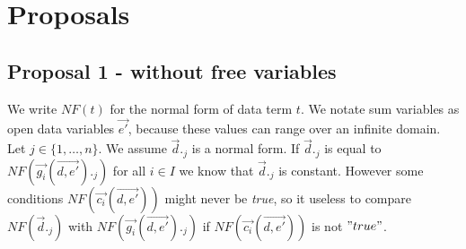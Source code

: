 \index{}\documentclass[a4paper,10pt]{article}
\theoremstyle{plain}
\theoremstyle{definition}
\newcommand{\tool}{\textit{lpeconstelm}}
\newcommand{\ovr}{\overrightarrow}
\newcommand{\pp}{process parameter}
\newcommand{\pps}{process parameters}
\newcommand{\ti}{\textit}
\newcommand{\Sig}{\nm{Sig}}
\newcommand{\Sort}{\nm{Sort}}
\newcommand{\Fun}{\nm{Fun}}
\newcommand{\ap}{{:}}
\begin{document}



\section{Proposals}
\subsection{Proposal 1 - without free variables} \label{sec:prop1}
We write $NF(t)$ for the normal form of data term $t$. 
We notate sum variables as open data variables $\ovr{e'}$, because these values can range over an infinite domain.
Let $j \in \lbrace 1, \ldots,  n \rbrace $. We assume $\ovr{d}._j$ is a normal form. If $\ovr{d}._j$ is equal to $NF(\ovr{g_i}(\ovr{d,e'})._j)$ for all $i \in I$ we know that $\ovr{d}._j$ is constant. However some conditions $NF(\ovr{c_i}(\ovr{d,e'}))$  might never be \ti{true}, so it useless to compare $NF(\ovr{d}._j)$ with $NF(\ovr{g_i}(\ovr{d,e'})._j)$  if $NF(\ovr{c_i}(\ovr{d,e'}))$ is not  $"true"$. \\
\end{document}
